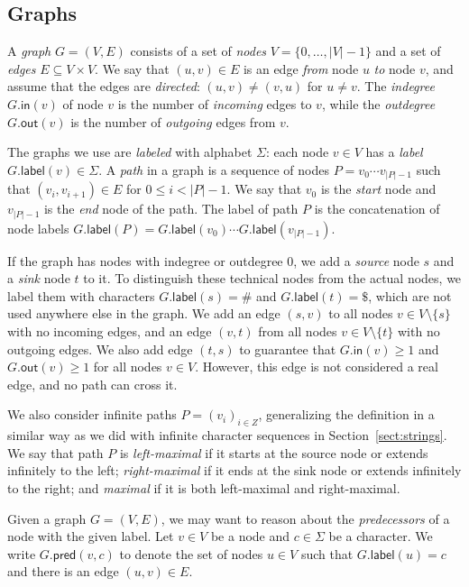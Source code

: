 \documentclass[twoside,leqno,twocolumn]{article}
\newcommand{\set}[1]{\ensuremath{\{ #1 \}}}
\newcommand{\abs}[1]{\ensuremath{\lvert #1 \rvert}}
\newcommand{\gindegree}{\ensuremath{\mathsf{in}}}
\newcommand{\goutdegree}{\ensuremath{\mathsf{out}}}
\newcommand{\glabel}{\ensuremath{\mathsf{label}}}
\newcommand{\gpred}{\ensuremath{\mathsf{pred}}}
\begin{document}
\subsection{Graphs}\label{sect:graphs}

A \emph{graph} $G = (V, E)$ consists of a set of \emph{nodes} $V = \set{0, \dotsc, \abs{V}-1}$ and a set of \emph{edges} $E \subseteq V \times V$. We say that $(u, v) \in E$ is an edge \emph{from} node $u$ \emph{to} node $v$, and assume that the edges are \emph{directed}: $(u, v) \ne (v, u)$ for $u \ne v$. The \emph{indegree} $G.\gindegree(v)$ of node $v$ is the number of \emph{incoming} edges to $v$, while the \emph{outdegree} $G.\goutdegree(v)$ is the number of \emph{outgoing} edges from $v$.

The graphs we use are \emph{labeled} with alphabet $\Sigma$: each node $v \in V$ has a \emph{label} $G.\glabel(v) \in \Sigma$. A \emph{path} in a graph is a sequence of nodes $P = v_{0} \dotsm v_{\abs{P}-1}$ such that $(v_{i}, v_{i+1}) \in E$ for $0 \le i < \abs{P}-1$. We say that $v_{0}$ is the \emph{start} node and $v_{\abs{P}-1}$ is the \emph{end} node of the path. The label of path $P$ is the concatenation of node labels $G.\glabel(P) = G.\glabel(v_{0}) \dotsm G.\glabel(v_{\abs{P}-1})$.

If the graph has nodes with indegree or outdegree $0$, we add a \emph{source} node $s$ and a \emph{sink} node $t$ to it. To distinguish these technical nodes from the actual nodes, we label them with characters $G.\glabel(s) = \#$ and $G.\glabel(t) = \$$, which are not used anywhere else in the graph. We add an edge $(s, v)$ to all nodes $v \in V \setminus \set{s}$ with no incoming edges, and an edge $(v, t)$ from all nodes $v \in V \setminus \set{t}$ with no outgoing edges. We also add edge $(t, s)$ to guarantee that $G.\gindegree(v) \ge 1$ and $G.\goutdegree(v) \ge 1$ for all nodes $v \in V$. However, this edge is not considered a real edge, and no path can cross it.

We also consider infinite paths $P = (v_{i})_{i \in Z}$, generalizing the definition in a similar way as we did with infinite character sequences in Section~\ref{sect:strings}. We say that path $P$ is \emph{left-maximal} if it starts at the source node or extends infinitely to the left; \emph{right-maximal} if it ends at the sink node or extends infinitely to the right; and \emph{maximal} if it is both left-maximal and right-maximal.

Given a graph $G = (V, E)$, we may want to reason about the \emph{predecessors} of a node with the given label. Let $v \in V$ be a node and $c \in \Sigma$ be a character. We write $G.\gpred(v, c)$ to denote the set of nodes $u \in V$ such that $G.\glabel(u) = c$ and there is an edge $(u, v) \in E$.
\end{document}
